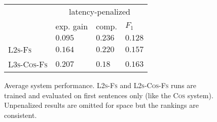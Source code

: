 \begin{figure}
  \center
  \begin{tabular}{ l | l l l |}
    &\multicolumn{3}{c}{latency-penalized}\\
    & exp. gain     & comp. & $F_1$ \\
    \hline
    \small \modelCos{}  & $0.095$ & $\mathbf{0.236}$ & $0.128$ \\
    \small \textsc{L2s-Fs}  & $0.164$ & $0.220$ & $0.157$ \\
    \small \textsc{L3s-Cos-Fs} & 
      $\mathbf{0.207}$ & $0.18~~$ & $\mathbf{0.163}$ \\
  \end{tabular}
  \caption{Average system performance. \textsc{L2s-Fs} and \textsc{L2s-Cos-Fs} 
           runs are trained and evaluated on first sentences only (like the 
           \textsc{Cos} system). Unpenalized results are omitted for space but
           the rankings are consistent.}
  \label{fig:lsfsresults}
\end{figure}


